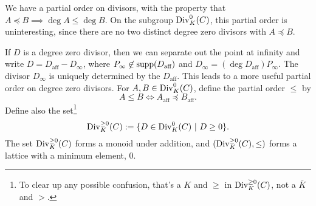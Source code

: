 We have a partial order on divisors, with the property that $A \preceq B \implies \deg A \leq \deg B$.
On the subgroup $\operatorname{Div}_K^0(C)$, this partial order is uninteresting,
since there are no two distinct degree zero divisors with $A \preceq B$.

If $D$ is a degree zero divisor,
then we can separate out the point at infinity and write $D = D_{\text{aff}} - D_\infty$,
where $P_\infty \not\in \operatorname{supp}(D_{\text{aff}})$ and $D_\infty = (\deg D_{\text{aff}})P_\infty$.
The divisor $D_\infty$ is uniquely determined by the $D_{\text{aff}}$.
This leads to a more useful partial order on degree zero divisors.
For $A, B \in \operatorname{Div}_K^0(C)$, define the partial order $\leq$ by
  \[ A \leq B \iff A_{\text{aff}} \preceq B_{\text{aff}}. \]
Define also the set\footnote{
To clear up any possible confusion,
that's a $K$ and $\geq$ in $\operatorname{Div}_K^{\geq 0}(C)$, not a $\bar K$ and $>$.}
  \[ \operatorname{Div}_K^{\geq 0}(C) := \{ D \in \operatorname{Div}_K^0(C) ~|~ D \geq 0 \}. \]
The set $\operatorname{Div}_K^{\geq 0}(C)$ forms a monoid under addition,
and $(\operatorname{Div}_K^{\geq 0}(C), \leq)$ forms a lattice with a minimum element, 0.

